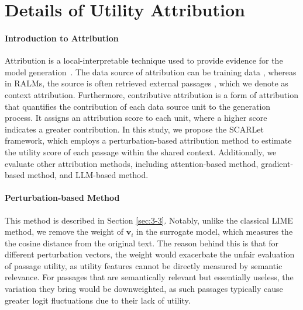 \documentclass[11pt]{article}
\begin{document}
\section{Details of Utility Attribution}
\label{sec:appendix_b}

\paragraph{Introduction to Attribution} Attribution is a local-interpretable technique used to provide evidence for the model generation~\citep{li2023attributionsurvey, xu2024aliiceevaluatingpositionalfinegrained}. The data source of attribution can be training data \citep{pretrainattribution1, pretrainattribution2}, whereas in RALMs, the source is often retrieved external passages \citep{ragattribution1, ragattribution2}, which we denote as context attribution. Furthermore, contributive attribution is a form of attribution that quantifies the contribution of each data source unit to the generation process. It assigns an attribution score to each unit, where a higher score indicates a greater contribution. In this study, we propose the SCARLet framework, which employs a perturbation-based attribution method to estimate the utility score of each passage within the shared context. Additionally, we evaluate other attribution methods, including attention-based method, gradient-based method, and LLM-based method.


\paragraph{Perturbation-based Method} This method is described in Section \ref{sec:3-3}. Notably, unlike the classical LIME method, we remove the weight of $\mathbf{v}_i$ in the surrogate model, which measures the the cosine distance from the original text. The reason behind this is that for different perturbation vectors, the weight would exacerbate the unfair evaluation of passage utility, as utility features cannot be directly measured by semantic relevance. For passages that are semantically relevant but essentially useless, the variation they bring would be downweighted, as such passages typically cause greater logit fluctuations due to their lack of utility.
\end{document}
